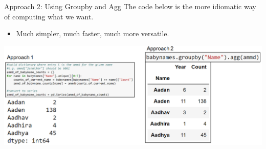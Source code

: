 \documentclass[aspectratio=169]{../latex_main/tntbeamer}  %
\begin{document}
    
    \begin{frame}{Approach 2: Using Groupby and Agg}
        The code below is the more idiomatic way of computing what we want.
        \begin{itemize}
            \item Much simpler, much faster, much more versatile.
        \end{itemize}
        \includegraphics[scale=.39]{Bild22}
    \end{frame}
    
    
    
\end{document}
